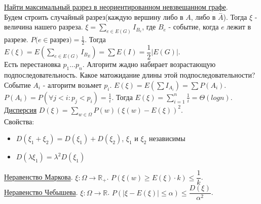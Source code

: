 \documentclass{article}
\newcommand{\R}{\mathbb{R}}
\newcommand{\tu}[1]{\underline{#1}}
\newcommand{\abs}[1]{\left|{#1}\right|}
\begin{document}
\tu{Найти максимальный разрез в неориентированном невзвешанном графе}. \\
Будем строить случайный разрез(каждую вершину либо в $A$, либо в $\stackrel{-}{A}$). Тогда $\xi$ - величина нашего разреза. $\xi = \sum_{e \in E(G)} I_{B_{e}}$, где $B_e$ - событие, когда $e$ лежит в разрезе. $P(e \in $разрез$) = \frac{1}{2}$. Тогда $E(\xi) = E(\sum_{e \in E(G)} I_{B_E}) = \sum E(I) = \dfrac{1}{2} \abs{E(G)}$. \\

Есть перестановка $ p_1 \dots p_n$. Алгоритм жадно набирает возрастающую подпоследовательность. Какое матожидание длины этой подпоследовательности? \\
Событие $A_i$ - алгоритм возьмет $p_i$. $E(\xi) = E(\sum I_{A_i}) = \sum P(A_i) $. $P(A_i) = P(\forall j < i : p_j < p_i) = \frac{1}{i}$. Тогда $E(\xi) = \sum_{i = 1}^n \frac{1}{i} = \Theta(log n)$. \\

\tu{Дисперсия} $D(\xi) = \sum_{w \in \Omega} P(w)(\xi(w) - E(\xi))^2$.\\
Свойства:

\begin{itemize}
	\item $D(\xi_1 + \xi_2) = D(\xi_1) + D(\xi_2)$, $\xi_1$ и $\xi_2$ независимы \\
	\item $D(\lambda \xi_1) = \lambda^2 D(\xi_1) $ \\
\end{itemize}

\tu{Неравенство Маркова}. $\xi : \Omega \rightarrow \R_+$. $P(\xi(w) \geq E(\xi) \cdot k) \leq \dfrac{1}{k} $. \\

\tu{Неравенство Чебышева}. $\xi : \Omega \rightarrow \R$. $P(\abs{\xi - E(\xi)} \leq \alpha) \leq \dfrac{D(\xi)}{\alpha^2}$.
\end{document}
